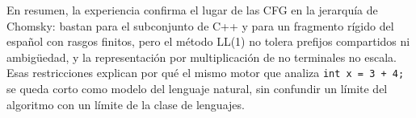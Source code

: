En resumen, la experiencia confirma el lugar de las CFG en la jerarquía de Chomsky: bastan para el subconjunto de C++ y para un fragmento rígido del español con rasgos finitos, pero el método LL(1) no tolera prefijos compartidos ni ambigüedad, y la representación por multiplicación de no terminales no escala. Esas restricciones explican por qué el mismo motor que analiza \texttt{int x = 3 + 4;} se queda corto como modelo del lenguaje natural, sin confundir un límite del algoritmo con un límite de la clase de lenguajes.
